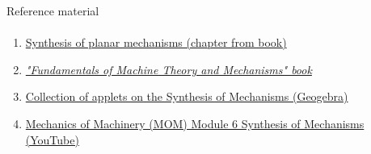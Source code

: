 \documentclass[aspectratio=169]{beamer}
\newcommand{\fbckg}[1]{\usebackgroundtemplate{\texttt{[image: \#1]}}}%
\begin{document}
\begin{frame}[t]{Reference material}
    \framesubtitle{}
    \begin{enumerate}
        \item \href{https://disk.yandex.ru/i/GCbdbYRq94vbxA}{Synthesis of planar mechanisms (chapter from book)}
        \item \href{https://link.springer.com/book/10.1007/978-3-319-31970-4\#toc}{\textit{"Fundamentals of Machine Theory and Mechanisms" book}}
        \item \href{https://www.geogebra.org/m/SF2rQXEp}{Collection of applets on the Synthesis of Mechanisms (Geogebra)}
        \item \href{https://www.youtube.com/playlist?list=PLH1r3LGlktdvKBfxlcIji4Shf_RrWw8on}{Mechanics of Machinery (MOM) Module 6 Synthesis of Mechanisms (YouTube)}
    \end{enumerate}
\end{frame}



\fbckg{fibeamer/figs/last_page.png}
\frame[plain]{}
\end{document}
